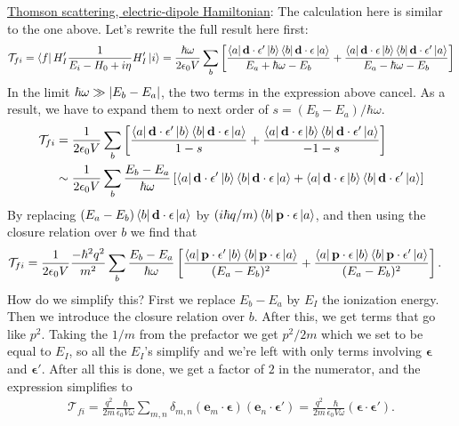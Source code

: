 \documentclass{article}
\theoremstyle{definition}
\newcommand{\f}[2]{\frac{#1}{#2}}
\newcommand{\lb}{\left[}
\newcommand{\rb}{\right]}
\begin{document}
\begin{enumerate}[label=(\alph*)]
\noindent \underline{Thomson scattering, electric-dipole Hamiltonian}: The calculation here is similar to the one above. Let's rewrite the full result here first:
\begin{align*}
\mathcal{T}_{fi} 
= \bra{f}  H_I'   \f{1}{ E_i - H_0 + i\eta}  H_I'   \ket{i}  
= \f{\hbar \omega}{2\epsilon_0 V} \sum_b \lb   
\f{\bra{a} \mathbf{d} \cdot \mathbf{\epsilon'} \ket{b} \bra{b} \mathbf{d} \cdot \mathbf{\epsilon} \ket{a}}{ E_a + \hbar \omega - E_b} 
+ 
\f{ \bra{a} \mathbf{d} \cdot \mathbf{\epsilon}    \ket{b} \bra{b} \mathbf{d} \cdot \mathbf{\epsilon'}    \ket{a}  }{E_a - \hbar \omega - E_b}  \rb
\end{align*} 
In the limit $\hbar \omega \gg \abs{E_b - E_a}$, the two terms in the expression above cancel. As a result, we have to expand them to next order of $s = (E_b - E_a)/\hbar \omega$. 
\begin{align*}
\mathcal{T}_{fi} 
&= \f{1}{2\epsilon_0 V} \sum_b \lb   
\f{
\bra{a} \mathbf{d} \cdot \mathbf{\epsilon'} \ket{b} \bra{b} \mathbf{d} \cdot \mathbf{\epsilon} \ket{a}
}{ 1-s} 
+ 
\f{ 
\bra{a} \mathbf{d} \cdot \mathbf{\epsilon}    \ket{b} \bra{b} \mathbf{d} \cdot \mathbf{\epsilon'}    \ket{a} 
 }{-1-s}  \rb  \\
&\sim \f{1}{2\epsilon_0 V} \sum_b 
\f{E_b - E_a}{\hbar \omega} \lb  
\bra{a} \mathbf{d} \cdot \mathbf{\epsilon'} \ket{b} \bra{b} \mathbf{d} \cdot \mathbf{\epsilon} \ket{a} 
+ 
\bra{a} \mathbf{d} \cdot \mathbf{\epsilon}    \ket{b} \bra{b} \mathbf{d} \cdot \mathbf{\epsilon'}    \ket{a} 
\rb
\end{align*}
By replacing $(E_a - E_b) \bra{b} \mathbf{d} \cdot \mathbf{\epsilon} \ket{a}$ by $(i\hbar q/m) \bra{b} \mathbf{p}\cdot \mathbf{\epsilon} \ket{a}$, and then using the closure relation over $b$ we find that
\begin{align*}
\mathcal{T}_{fi} 
&= \f{1}{2\epsilon_0 V} \f{-\hbar^2 q^2}{m^2} \sum_b 
\f{E_b - E_a}{\hbar \omega} \lb  
\f{ 
\bra{a} \mathbf{p} \cdot \mathbf{\epsilon'} \ket{b} \bra{b} \mathbf{p} \cdot \mathbf{\epsilon} \ket{a} 
 }{(E_a - E_b)^2}  + 
 \f{
 \bra{a} \mathbf{p} \cdot \mathbf{\epsilon}    \ket{b} \bra{b} \mathbf{p} \cdot \mathbf{\epsilon'}    \ket{a} 
 }
 {(E_a - E_b)^2}
 \rb.
\end{align*}
How do we simplify this? First we replace $E_b - E_a$ by $E_I$ the ionization energy. Then we introduce the closure relation over $b$. After this, we get terms that go like $p^2$. Taking the $1/m$ from the prefactor we get $p^2/2m$ which we set to be equal to $E_I$, so all the $E_I$'s simplify and we're left with only terms involving $\mathbf{\epsilon}$ and $\mathbf{\epsilon'}$.  After all this is done, we get a factor of $2$ in the numerator, and the expression simplifies to 
\begin{align*}
\mathcal{T}_{fi} = 
\f{q^2}{2m} \f{\hbar}{\epsilon_0 V \omega} \sum_{m,n} \delta_{m,n} (\mathbf{e}_m \cdot \mathbf{\epsilon})(\mathbf{e}_n \cdot \mathbf{\epsilon'}) = 
\f{q^2}{2m} \f{\hbar}{\epsilon_0 V \omega} (\mathbf{\epsilon}\cdot \mathbf{\epsilon'}).
\end{align*}






\end{enumerate}
\end{document}
